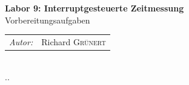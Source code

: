 \documentclass[12pt]{article}
\begin{document}
\begin{titlepage}

{ \huge \bfseries Labor 9: Interruptgesteuerte Zeitmessung}\\ %
\vspace{0.034441853748633004\paperheight}
\large Vorbereitungsaufgaben\\
\vspace{0.1458980337503154\paperheight}


  \begin{tabular}{lr}
    \emph{Autor:} & Richard {\color{hsblue}\textsc{Grünert}}
   \end{tabular}\\[0.05572809000084118\paperheight]

{\large {\the\day.\the\month.\the\year}}\\




\vfill %

\end{titlepage}
\end{document}
